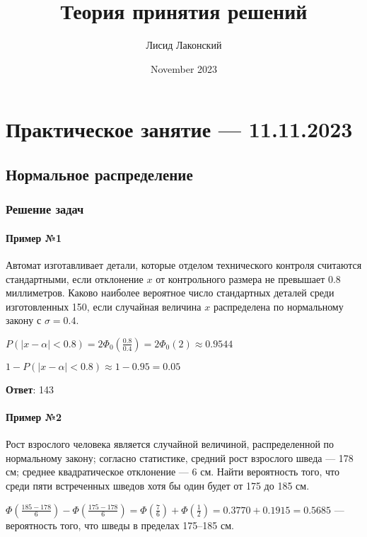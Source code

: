 \documentclass{article}
\title{Теория принятия решений}
\author{Лисид Лаконский}
\date{November 2023}
\begin{document}
\raggedright

\maketitle

\tableofcontents
\pagebreak

\section{Практическое занятие — 11.11.2023}

\subsection{Нормальное распределение}

\subsubsection{Решение задач}

\paragraph{Пример №1}

Автомат изготавливает детали, которые отделом технического контроля считаются стандартными, если отклонение $x$ от контрольного размера не превышает $0.8$ миллиметров. Каково наиболее вероятное число стандартных деталей среди изготовленных 150, если случайная величина $x$ распределена по нормальному закону с $\sigma = 0.4$.

$P(|x - \alpha| < 0.8) = 2 \Phi_0 (\frac{0.8}{0.4}) = 2 \Phi_0(2) \approx 0.9544$

$1 - P(|x - \alpha| < 0.8) \approx 1 -0.95 = 0.05$

\textbf{Ответ}: 143

\paragraph{Пример №2}

Рост взрослого человека является случайной величиной, распределенной по нормальному закону; согласно статистике, средний рост взрослого шведа — 178 см; среднее квадратическое отклонение — 6 см. Найти вероятность того, что среди пяти встреченных шведов хотя бы один будет от 175 до 185 см.

$\Phi (\frac{185 - 178}{6}) - \Phi (\frac{175 - 178}{6}) = \Phi (\frac{7}{6}) + \Phi (\frac{1}{2}) = 0.3770 + 0.1915 = 0.5685$ — вероятность того, что шведы в пределах 175–185 см.
\end{document}
